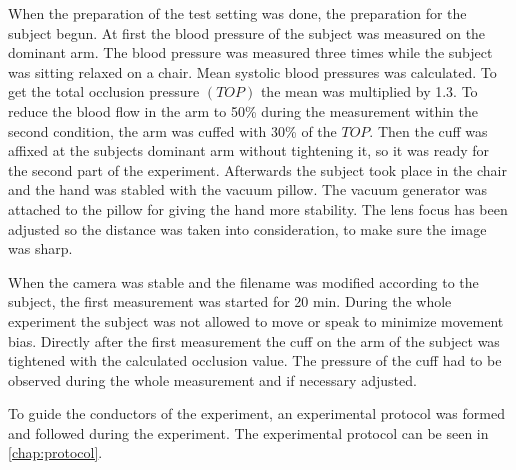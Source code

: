 When the preparation of the test setting was done, the preparation for the subject begun. At first the blood pressure of the subject was measured on the dominant arm. The blood pressure was measured three times while the subject was sitting relaxed on a chair. Mean systolic blood pressures was calculated. To get the total occlusion pressure $(TOP)$ the mean was multiplied by 1.3. To reduce the blood flow in the arm to 50\% during the measurement within the second condition, the arm was cuffed with 30\% of the $TOP$.\cite{mouser2017} 
Then the cuff was affixed at the subjects dominant arm without tightening it, so it was ready for the second part of the experiment. Afterwards the subject took place in the chair and the hand was stabled with the vacuum pillow. The vacuum generator was attached to the pillow for giving the hand more stability. The lens focus has been adjusted so the distance was taken into consideration, to make sure the image was sharp.

When the camera was stable and the filename was modified according to the subject, the first measurement was started for 20 min. During the whole experiment the subject was not allowed to move or speak to minimize movement bias.
Directly after the first measurement the cuff on the arm of the subject was tightened with the calculated occlusion value. The pressure of the cuff had to be observed during the whole measurement and if necessary adjusted.

To guide the conductors of the experiment, an experimental protocol was formed and followed during the experiment. The experimental protocol can be seen in \cref{chap:protocol}. 

